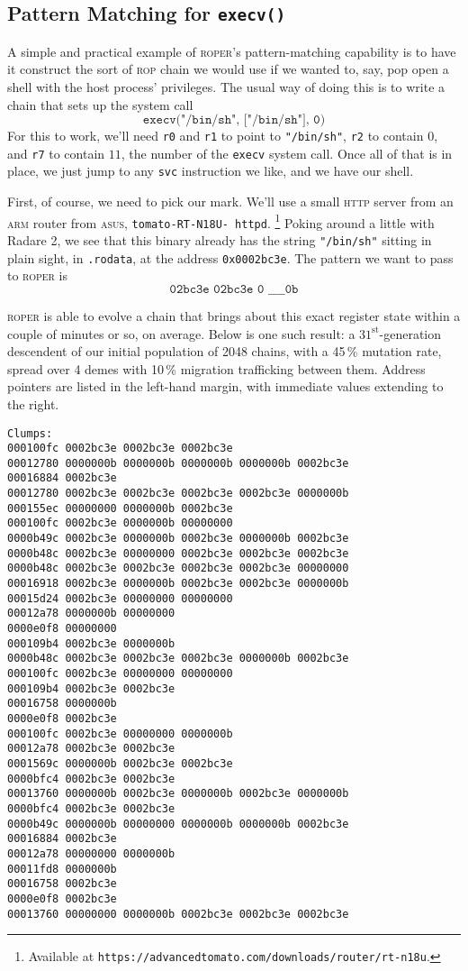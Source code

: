\subsection{Pattern Matching for \texttt{execv()}}

A simple and practical example of \textsc{roper}'s
pattern-matching capability is to have it construct the sort of
\textsc{rop} chain we would use if we wanted to, say, pop open a
shell with the host process' privileges. The usual way of
doing this is to write a chain that sets up the system call
$$\texttt{execv("/bin/sh", ["/bin/sh"], 0)}$$
For this to work, we'll need \texttt{r0} and \texttt{r1} to point to
\texttt{"/bin/sh"}, \texttt{r2} to contain $0$, and
\texttt{r7} to contain $11$, the number of the \texttt{execv}
system call. Once all of that is in place, we just jump to any
\texttt{svc} instruction we like, and we have our shell.

First, of course, we need to pick our mark. We'll use a small
\textsc{http} server from an  \textsc{arm} router from \textsc{asus},
\texttt{tomato-RT-N18U- httpd}.%
\footnote{Available at
\texttt{https://advancedtomato.com/downloads/router/rt-n18u}.}
Poking around a little with
Radare 2, we see that this binary already has the string
\texttt{"/bin/sh"} sitting in plain sight, in \texttt{.rodata},
at the address \texttt{0x0002bc3e}. The pattern we want to pass to
\textsc{roper} is
$$\texttt{02bc3e 02bc3e 0 \_ \_ \_ \_ 0b}$$

\textsc{roper} is able to evolve a chain that brings about this
exact register state within a couple of minutes or so, on
average. Below is one such result: a
$31^{\textrm{st}}$-generation descendent of our initial
population of 2048 chains, with a 45\,\% mutation rate, spread over
4 demes with 10\,\% migration trafficking between them. Address
pointers are listed in the left-hand margin, with immediate
values extending to the right. 

{\small
\begin{verbatim}
Clumps:
000100fc 0002bc3e 0002bc3e 0002bc3e 
00012780 0000000b 0000000b 0000000b 0000000b 0002bc3e 
00016884 0002bc3e 
00012780 0002bc3e 0002bc3e 0002bc3e 0002bc3e 0000000b 
000155ec 00000000 0000000b 0002bc3e 
000100fc 0002bc3e 0000000b 00000000 
0000b49c 0002bc3e 0000000b 0002bc3e 0000000b 0002bc3e 
0000b48c 0002bc3e 00000000 0002bc3e 0002bc3e 0002bc3e 
0000b48c 0002bc3e 0002bc3e 0002bc3e 0002bc3e 00000000 
00016918 0002bc3e 0000000b 0002bc3e 0002bc3e 0000000b 
00015d24 0002bc3e 00000000 00000000 
00012a78 0000000b 00000000 
0000e0f8 00000000 
000109b4 0002bc3e 0000000b 
0000b48c 0002bc3e 0002bc3e 0002bc3e 0000000b 0002bc3e 
000100fc 0002bc3e 00000000 00000000 
000109b4 0002bc3e 0002bc3e 
00016758 0000000b 
0000e0f8 0002bc3e 
000100fc 0002bc3e 00000000 0000000b 
00012a78 0002bc3e 0002bc3e 
0001569c 0000000b 0002bc3e 0002bc3e 
0000bfc4 0002bc3e 0002bc3e 
00013760 0000000b 0002bc3e 0000000b 0002bc3e 0000000b 
0000bfc4 0002bc3e 0002bc3e 
0000b49c 0000000b 00000000 0000000b 0000000b 0002bc3e 
00016884 0002bc3e 
00012a78 00000000 0000000b 
00011fd8 0000000b 
00016758 0002bc3e 
0000e0f8 0002bc3e 
00013760 00000000 0000000b 0002bc3e 0002bc3e 0002bc3e 
\end{verbatim}
}

